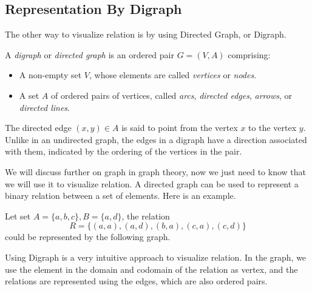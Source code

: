 	\subsection{Representation By Digraph}
	The other way to visualize relation is by using Directed Graph, or Digraph.
	\begin{definition}[Digraph]
		A \textit{digraph} or \textit{directed graph} is an ordered pair $G = (V, A)$ comprising:
		\begin{itemize}
			\item A non-empty set $V$, whose elements are called \textit{vertices} or \textit{nodes}.
			\item A set $A$ of ordered pairs of vertices, called \textit{arcs}, \textit{directed edges}, \textit{arrows}, or \textit{directed lines}.
		\end{itemize}
		The directed edge $(x, y) \in A$ is said to point from the vertex $x$ to the vertex $y$. Unlike in an undirected graph, the edges in a digraph have a direction associated with them, indicated by the ordering of the vertices in the pair.
	\end{definition}
	We will discuss further on graph in graph theory, now we just need to know that we will use it to visualize relation.
	A directed graph can be used to represent a binary relation between a set of elements. Here is an example.
\begin{example}
	Let set $A = \{a,b,c\}, B = \{a,d\}$, the relation $$R=\{(a,a),(a,d), (b,a),(c,a),(c,d)\}$$ could be represented by the following graph.

	\begin{center}
	\end{center}
\end{example}
Using Digraph is a very intuitive approach to visualize relation. In the graph, we use the element in the domain and codomain of the relation as vertex, and the relations are represented using the edges, which are also ordered pairs.

